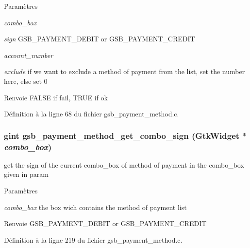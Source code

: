 \begin{DoxyParams}{Paramètres}
\item[{\em combo\_\-box}]\item[{\em sign}]GSB\_\-PAYMENT\_\-DEBIT or GSB\_\-PAYMENT\_\-CREDIT \item[{\em account\_\-number}]\item[{\em exclude}]if we want to exclude a method of payment from the list, set the number here, else set 0\end{DoxyParams}
\begin{DoxyReturn}{Renvoie}
FALSE if fail, TRUE if ok 
\end{DoxyReturn}


Définition à la ligne 68 du fichier gsb\_\-payment\_\-method.c.

\subsubsection[{gsb\_\-payment\_\-method\_\-get\_\-combo\_\-sign}]{\setlength{\rightskip}{0pt plus 5cm}gint gsb\_\-payment\_\-method\_\-get\_\-combo\_\-sign (GtkWidget $\ast$ {\em combo\_\-box})}\label{gsb__payment__method_8c_a3da00935a5480a41d3b8b31b3f073bfd}
get the sign of the current combo\_\-box of method of payment in the combo\_\-box given in param


\begin{DoxyParams}{Paramètres}
\item[{\em combo\_\-box}]the box wich contains the method of payment list\end{DoxyParams}
\begin{DoxyReturn}{Renvoie}
GSB\_\-PAYMENT\_\-DEBIT or GSB\_\-PAYMENT\_\-CREDIT 
\end{DoxyReturn}


Définition à la ligne 219 du fichier gsb\_\-payment\_\-method.c.

